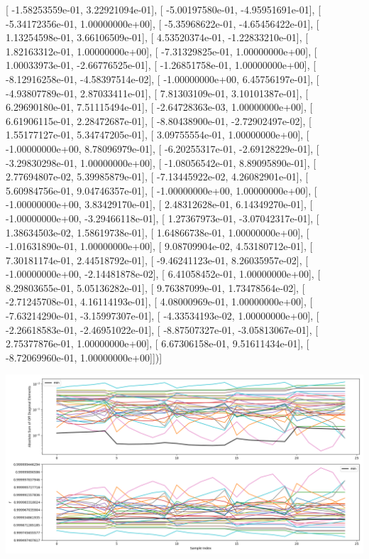 \documentclass{article}
\begin{document}
       [ -1.58253559e-01,   3.22921094e-01],
       [ -5.00197580e-01,  -4.95951691e-01],
       [ -5.34172356e-01,   1.00000000e+00],
       [ -5.35968622e-01,  -4.65456422e-01],
       [  1.13254598e-01,   3.66106509e-01],
       [  4.53520374e-01,  -1.22833210e-01],
       [  1.82163312e-01,   1.00000000e+00],
       [ -7.31329825e-01,   1.00000000e+00],
       [  1.00033973e-01,  -2.66776525e-01],
       [ -1.26851758e-01,   1.00000000e+00],
       [ -8.12916258e-01,  -4.58397514e-02],
       [ -1.00000000e+00,   6.45756197e-01],
       [ -4.93807789e-01,   2.87033411e-01],
       [  7.81303109e-01,   3.10101387e-01],
       [  6.29690180e-01,   7.51115494e-01],
       [ -2.64728363e-03,   1.00000000e+00],
       [  6.61906115e-01,   2.28472687e-01],
       [ -8.80438900e-01,  -2.72902497e-02],
       [  1.55177127e-01,   5.34747205e-01],
       [  3.09755554e-01,   1.00000000e+00],
       [ -1.00000000e+00,   8.78096979e-01],
       [ -6.20255317e-01,  -2.69128229e-01],
       [ -3.29830298e-01,   1.00000000e+00],
       [ -1.08056542e-01,   8.89095890e-01],
       [  2.77694807e-02,   5.39985879e-01],
       [ -7.13445922e-02,   4.26082901e-01],
       [  5.60984756e-01,   9.04746357e-01],
       [ -1.00000000e+00,   1.00000000e+00],
       [ -1.00000000e+00,   3.83429170e-01],
       [  2.48312628e-01,   6.14349270e-01],
       [ -1.00000000e+00,  -3.29466118e-01],
       [  1.27367973e-01,  -3.07042317e-01],
       [  1.38634503e-02,   1.58619738e-01],
       [  1.64866738e-01,   1.00000000e+00],
       [ -1.01631890e-01,   1.00000000e+00],
       [  9.08709904e-02,   4.53180712e-01],
       [  7.30181174e-01,   2.44518792e-01],
       [ -9.46241123e-01,   8.26035957e-02],
       [ -1.00000000e+00,  -2.14481878e-02],
       [  6.41058452e-01,   1.00000000e+00],
       [  8.29803655e-01,   5.05136282e-01],
       [  9.76387099e-01,   1.73478564e-02],
       [ -2.71245708e-01,   4.16114193e-01],
       [  4.08000969e-01,   1.00000000e+00],
       [ -7.63214290e-01,  -3.15997307e-01],
       [ -4.33534193e-02,   1.00000000e+00],
       [ -2.26618583e-01,  -2.46951022e-01],
       [ -8.87507327e-01,  -3.05813067e-01],
       [  2.75377876e-01,   1.00000000e+00],
       [  6.67306158e-01,   9.51611434e-01],
       [ -8.72069960e-01,   1.00000000e+00]])]
\begin{center}
\includegraphics[scale=.9]{report_pickled_controls223/control_dpn_all.png}

\end{center}
\end{document}
